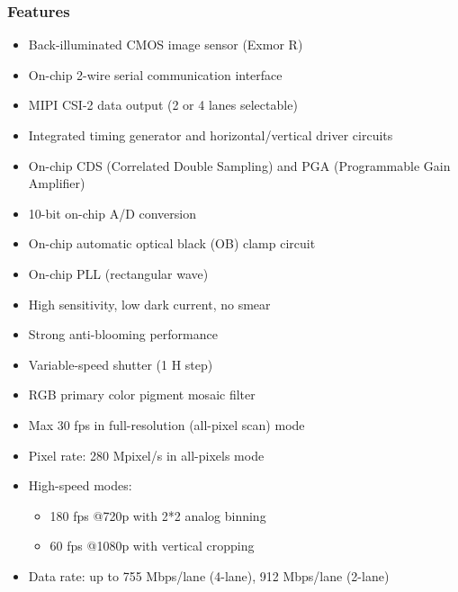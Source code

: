 \subsubsection{Features}
\begin{itemize}
    \item Back-illuminated CMOS image sensor (Exmor R\texttrademark)
    \item On-chip 2-wire serial communication interface
    \item MIPI CSI-2 data output (2 or 4 lanes selectable)
    \item Integrated timing generator and horizontal/vertical driver circuits
    \item On-chip CDS (Correlated Double Sampling) and PGA (Programmable Gain Amplifier)
    \item 10-bit on-chip A/D conversion
    \item On-chip automatic optical black (OB) clamp circuit
    \item On-chip PLL (rectangular wave)
    \item High sensitivity, low dark current, no smear
    \item Strong anti-blooming performance
    \item Variable-speed shutter (1 H step)
    \item RGB primary color pigment mosaic filter
    \item Max 30 fps in full-resolution (all-pixel scan) mode
    \item Pixel rate: 280 Mpixel/s in all-pixels mode
    \item High-speed modes: 
        \begin{itemize}
        \item 180 fps @720p with 2*2 analog binning
        \item 60 fps @1080p with vertical cropping
        \end{itemize}
    \item Data rate: up to 755 Mbps/lane (4-lane), 912 Mbps/lane (2-lane)
\end{itemize}

